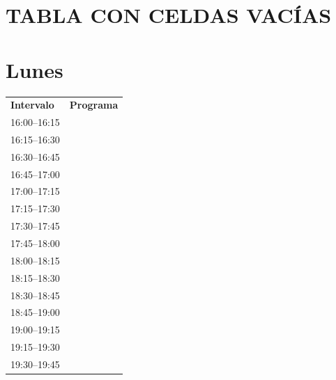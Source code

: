 \documentclass[11pt,a4paper]{article}
\begin{document}
\section*{TABLA CON CELDAS VACÍAS}
\section*{Lunes}
\begin{center}
\begin{adjustbox}{max totalsize={\textwidth}{0.82\textheight},center}
\begin{tabular}{|p{3.6cm}|p{11cm}|}
\hline
\textbf{Intervalo} & \textbf{Programa} \\
\cline{1-1}
{\centering\rule{0pt}{2.80ex}16:00--16:15} & {\centering\rule{0pt}{2.80ex}} \\
\cline{1-1}
{\centering\rule{0pt}{2.80ex}16:15--16:30} & {\centering\rule{0pt}{2.80ex}} \\
\cline{1-1}
{\centering\rule{0pt}{2.80ex}16:30--16:45} & {\centering\rule{0pt}{2.80ex}} \\
\cline{1-1}
{\centering\rule{0pt}{2.80ex}16:45--17:00} & {\centering\rule{0pt}{2.80ex}} \\
\cline{1-1}
{\centering\rule{0pt}{2.80ex}17:00--17:15} & {\centering\rule{0pt}{2.80ex}} \\
\cline{1-1}
{\centering\rule{0pt}{2.80ex}17:15--17:30} & {\centering\rule{0pt}{2.80ex}} \\
\cline{1-1}
{\centering\rule{0pt}{2.80ex}17:30--17:45} & {\centering\rule{0pt}{2.80ex}} \\
\cline{1-1}
{\centering\rule{0pt}{2.80ex}17:45--18:00} & {\centering\rule{0pt}{2.80ex}} \\
\cline{1-1}
{\centering\rule{0pt}{2.80ex}18:00--18:15} & {\centering\rule{0pt}{2.80ex}} \\
\cline{1-1}
{\centering\rule{0pt}{2.80ex}18:15--18:30} & {\centering\rule{0pt}{2.80ex}} \\
\cline{1-1}
{\centering\rule{0pt}{2.80ex}18:30--18:45} & {\centering\rule{0pt}{2.80ex}} \\
\cline{1-1}
{\centering\rule{0pt}{2.80ex}18:45--19:00} & {\centering\rule{0pt}{2.80ex}} \\
\cline{1-1}
{\centering\rule{0pt}{2.80ex}19:00--19:15} & {\centering\rule{0pt}{2.80ex}} \\
\cline{1-1}
{\centering\rule{0pt}{2.80ex}19:15--19:30} & {\centering\rule{0pt}{2.80ex}} \\
\cline{1-1}
{\centering\rule{0pt}{2.80ex}19:30--19:45} & {\centering\rule{0pt}{2.80ex}} \\

\end{tabular}
\end{adjustbox}
\end{center}
\end{document}
